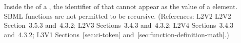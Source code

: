 Inside the  of a \FunctionDefinition, the identifier of that
\FunctionDefinition cannot appear as the value of a  element.
SBML functions are not permitted to be recursive.  (References: L2V2
L2V2 Section~3.5.3 and~4.3.2; L2V3 Sections~3.4.3 and~4.3.2; L2V4 Sections~3.4.3 and~4.3.2; 
L3V1 Sections~\ref{sec:ci-token} and~\ref{sec:function-definition-math}.)
